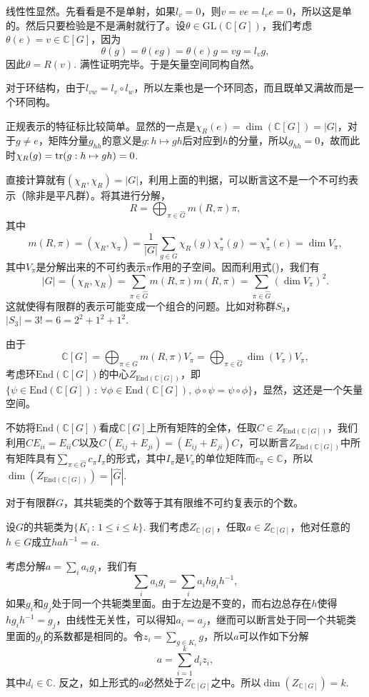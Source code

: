 \documentclass[11pt]{article}
\theoremstyle{definition}
\theoremstyle{plain}
\newcommand{\cc}{\mathbb{C}}
\begin{document}
\proof
	线性性显然。先看看是不是单射，如果$l_v=0$，则$v=ve=l_ve=0$，所以这是单的。然后只要检验是不是满射就行了。设$\theta\in \mathrm{GL}(\cc [G])$，我们考虑$\theta(e)=v\in \cc [G]$，因为
	\[
		\theta(g)=\theta(eg)=\theta(e)g=vg=l_vg,
	\]
	因此$\theta=R(v)$. 满性证明完毕。于是矢量空间同构自然。

	对于环结构，由于$l_{vw}=l_v\circ l_w$，所以左乘也是一个环同态，而且既单又满故而是一个环同构。
\endproof

\para 正规表示的特征标比较简单。显然的一点是$\chi_R(e)=\dim (\cc [G])=|G|$，对于$g\neq e$，矩阵分量$g_{hh}$的意义是$g:h\mapsto gh$后对应到$h$的分量，所以$g_{hh}=0$，故而此时$\chi_R(g)=\operatorname{tr}(g:h\mapsto gh)=0$.

直接计算就有$(\chi_{R},\chi_{R})=|G|$，利用上面的判据，可以断言这不是一个不可约表示（除非是平凡群）。将其进行分解，
\[
	R=\bigoplus_{\pi\in\hat{G}}m(R,\pi)\pi,
\]
其中
\[
	m(R,\pi)=(\chi_R,\chi_\pi)=\frac{1}{|G|}\sum_{g\in G}\chi_R(g)\chi_{\pi}^*(g)=\chi_{\pi}^*(e)=\dim V_{\pi},
\]
其中$V_\pi$是分解出来的不可约表示$\pi$作用的子空间。因而利用式(\theequation)，我们有
\[
	|G|=(\chi_{R},\chi_{R})=\sum_{\pi\in\hat{G}}m(R,\pi)m(R,\pi)=\sum_{\pi\in\hat{G}}(\dim V_{\pi})^2.
\]
这就使得有限群的表示可能变成一个组合的问题。比如对称群$S_3$，$|S_3|=3!=6=2^2+1^2+1^2$.

\para 由于
\[
	\cc [G]=\bigoplus_{\pi\in\hat{G}}m(R,\pi)V_\pi=\bigoplus_{\pi\in\hat{G}}\dim(V_\pi)V_\pi,
\]
考虑环$\mathrm{End}(\cc [G])$的中心$Z_{\mathrm{End}(\cc [G])}$，即$\{\psi\in \mathrm{End}(\cc [G])\,:\, \forall \phi\in \mathrm{End}(\cc [G]),\, \phi\circ\psi=\psi\circ\phi\}$，显然，这还是一个矢量空间。

不妨将$\mathrm{End}(\cc [G])$看成$\cc [G]$上所有矩阵的全体，任取$C\in Z_{\mathrm{End}(\cc [G])}$，我们利用$CE_{ii}=E_{ii}C$以及$C(E_{ij}+E_{ji})=(E_{ij}+E_{ji})C$，可以断言$Z_{\mathrm{End}(\cc [G])}$中所有矩阵具有$\sum_{\pi\in \hat{G}}c_\pi I_\pi$的形式，其中$I_\pi$是$V_\pi$的单位矩阵而$c_\pi\in\cc$，所以$\dim (Z_{\mathrm{End}(\cc [G])})=|\hat{G}|$.

{\thm 对于有限群$G$，其共轭类的个数等于其有限维不可约复表示的个数。\endthm}

\proof 设$G$的共轭类为$\{K_i\,:\, 1\leq i\leq k\}$. 我们考虑$Z_{\cc [G]}$，任取$a\in Z_{\cc [G]}$，他对任意的$h\in G$成立$hah^{-1}=a$. 

考虑分解$a=\sum_i a_ig_i$，我们有
\[
	\sum_i a_ig_i=\sum_i a_ihg_ih^{-1},
\]
如果$g_i$和$g_j$处于同一个共轭类里面。由于左边是不变的，而右边总存在$h$使得$hg_ih^{-1}=g_j$，由线性无关性，可以得知$a_i=a_j$，继而可以断言处于同一个共轭类里面的$g_i$的系数都是相同的。令$z_i=\sum_{g\in K_i}g$，所以$a$可以作如下分解
\[
	a=\sum_{i=1}^kd_iz_i,
\]
其中$d_i\in \cc$. 反之，如上形式的$a$必然处于$Z_{\cc [G]}$之中。所以$\dim (Z_{\cc [G]})=k$.
\end{document}
